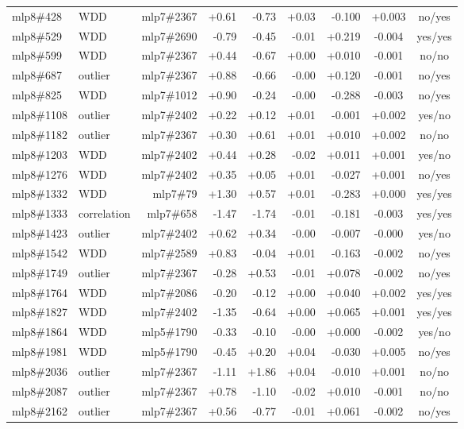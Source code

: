 \begin{center}
\begin{longtable}{llrrrrrcc}
mlp8\#428 & WDD & mlp7\#2367 & +0.61 & -0.73 & +0.03 & -0.100 & +0.003 & no/yes \\
mlp8\#529 & WDD & mlp7\#2690 & -0.79 & -0.45 & -0.01 & +0.219 & -0.004 & yes/yes \\
mlp8\#599 & WDD & mlp7\#2367 & +0.44 & -0.67 & +0.00 & +0.010 & -0.001 & no/no \\
mlp8\#687 & outlier & mlp7\#2367 & +0.88 & -0.66 & -0.00 & +0.120 & -0.001 & no/yes \\
mlp8\#825 & WDD & mlp7\#1012 & +0.90 & -0.24 & -0.00 & -0.288 & -0.003 & no/yes \\
mlp8\#1108 & outlier & mlp7\#2402 & +0.22 & +0.12 & +0.01 & -0.001 & +0.002 & yes/no \\
mlp8\#1182 & outlier & mlp7\#2367 & +0.30 & +0.61 & +0.01 & +0.010 & +0.002 & no/no \\
mlp8\#1203 & WDD & mlp7\#2402 & +0.44 & +0.28 & -0.02 & +0.011 & +0.001 & yes/no \\
mlp8\#1276 & WDD & mlp7\#2402 & +0.35 & +0.05 & +0.01 & -0.027 & +0.001 & no/yes \\
mlp8\#1332 & WDD & mlp7\#79 & +1.30 & +0.57 & +0.01 & -0.283 & +0.000 & yes/yes \\
mlp8\#1333 & correlation & mlp7\#658 & -1.47 & -1.74 & -0.01 & -0.181 & -0.003 & yes/yes \\
mlp8\#1423 & outlier & mlp7\#2402 & +0.62 & +0.34 & -0.00 & -0.007 & -0.000 & yes/no \\
mlp8\#1542 & WDD & mlp7\#2589 & +0.83 & -0.04 & +0.01 & -0.163 & -0.002 & no/yes \\
mlp8\#1749 & outlier & mlp7\#2367 & -0.28 & +0.53 & -0.01 & +0.078 & -0.002 & no/yes \\
mlp8\#1764 & WDD & mlp7\#2086 & -0.20 & -0.12 & +0.00 & +0.040 & +0.002 & yes/yes \\
mlp8\#1827 & WDD & mlp7\#2402 & -1.35 & -0.64 & +0.00 & +0.065 & +0.001 & yes/yes \\
mlp8\#1864 & WDD & mlp5\#1790 & -0.33 & -0.10 & -0.00 & +0.000 & -0.002 & yes/no \\
mlp8\#1981 & WDD & mlp5\#1790 & -0.45 & +0.20 & +0.04 & -0.030 & +0.005 & no/yes \\
mlp8\#2036 & outlier & mlp7\#2367 & -1.11 & +1.86 & +0.04 & -0.010 & +0.001 & no/no \\
mlp8\#2087 & outlier & mlp7\#2367 & +0.78 & -1.10 & -0.02 & +0.010 & -0.001 & no/no \\
mlp8\#2162 & outlier & mlp7\#2367 & +0.56 & -0.77 & -0.01 & +0.061 & -0.002 & no/yes \\

\end{longtable}
\end{center}
